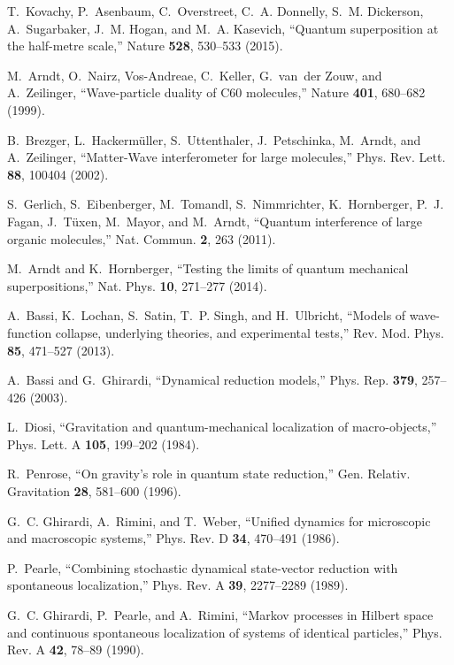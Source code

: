\documentclass[%
 twocolumn,
 amsmath,amssymb,
 aps,
 pra,
]{revtex4-1}
\begin{document}
\begin{thebibliography}{10}
T.~Kovachy, P.~Asenbaum, C.~Overstreet, C.~A. Donnelly, S.~M. Dickerson,
  A.~Sugarbaker, J.~M. Hogan, and M.~A. Kasevich, \enquote{{Quantum
  superposition at the half-metre scale},} Nature \textbf{528}, 530--533
  (2015).

M.~Arndt, O.~Nairz, Vos-Andreae, C.~Keller, G.~van~der Zouw, and A.~Zeilinger,
  \enquote{{Wave-particle duality of C60 molecules},} Nature \textbf{401},
  680--682 (1999).

B.~Brezger, L.~Hackerm{\"u}ller, S.~Uttenthaler, J.~Petschinka, M.~Arndt, and
  A.~Zeilinger, \enquote{{Matter-Wave interferometer for large molecules},}
  Phys. Rev. Lett. \textbf{88}, 100404 (2002).

S.~Gerlich, S.~Eibenberger, M.~Tomandl, S.~Nimmrichter, K.~Hornberger, P.~J.
  Fagan, J.~T{\"u}xen, M.~Mayor, and M.~Arndt, \enquote{{Quantum interference
  of large organic molecules},} Nat. Commun. \textbf{2}, 263 (2011).

M.~Arndt and K.~Hornberger, \enquote{{Testing the limits of quantum mechanical
  superpositions},} Nat. Phys. \textbf{10}, 271--277 (2014).

A.~Bassi, K.~Lochan, S.~Satin, T.~P. Singh, and H.~Ulbricht, \enquote{{Models
  of wave-function collapse, underlying theories, and experimental tests},}
  Rev. Mod. Phys. \textbf{85}, 471--527 (2013).

A.~Bassi and G.~Ghirardi, \enquote{{Dynamical reduction models},} Phys. Rep.
  \textbf{379}, 257--426 (2003).

L.~Diosi, \enquote{{Gravitation and quantum-mechanical localization of
  macro-objects},} Phys. Lett. A \textbf{105}, 199--202 (1984).

R.~Penrose, \enquote{{On gravity's role in quantum state reduction},} Gen.
  Relativ. Gravitation \textbf{28}, 581--600 (1996).

G.~C. Ghirardi, A.~Rimini, and T.~Weber, \enquote{{Unified dynamics for
  microscopic and macroscopic systems},} Phys. Rev. D \textbf{34}, 470--491
  (1986).

P.~Pearle, \enquote{{Combining stochastic dynamical state-vector reduction with
  spontaneous localization},} Phys. Rev. A \textbf{39}, 2277--2289 (1989).

G.~C. Ghirardi, P.~Pearle, and A.~Rimini, \enquote{{Markov processes in Hilbert
  space and continuous spontaneous localization of systems of identical
  particles},} Phys. Rev. A \textbf{42}, 78--89 (1990).


\end{thebibliography}
\end{document}
